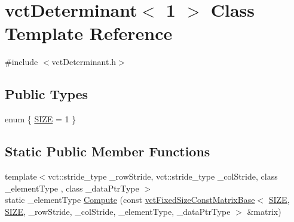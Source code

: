 \hypertarget{classvct_determinant_3_011_01_4}{\section{vct\-Determinant$<$ 1 $>$ Class Template Reference}
\label{classvct_determinant_3_011_01_4}
}


{\ttfamily \#include $<$vct\-Determinant.\-h$>$}

\subsection*{Public Types}
\begin{DoxyCompactItemize}
\item 
enum \{ \hyperlink{classvct_determinant_3_011_01_4_ae73865b91d79204caa787acd03c99885a105e61510b1504060ff5d4bf5e35f8f9}{S\-I\-Z\-E} = 1
 \}
\end{DoxyCompactItemize}
\subsection*{Static Public Member Functions}
\begin{DoxyCompactItemize}
\item 
{\footnotesize template$<$vct\-::stride\-\_\-type \-\_\-row\-Stride, vct\-::stride\-\_\-type \-\_\-col\-Stride, class \-\_\-element\-Type , class \-\_\-data\-Ptr\-Type $>$ }\\static \-\_\-element\-Type \hyperlink{classvct_determinant_3_011_01_4_a6406b6e1406b14ea280cc5dec6d2ad99}{Compute} (const \hyperlink{classvct_fixed_size_const_matrix_base}{vct\-Fixed\-Size\-Const\-Matrix\-Base}$<$ \hyperlink{classvct_determinant_3_011_01_4_ae73865b91d79204caa787acd03c99885a105e61510b1504060ff5d4bf5e35f8f9}{S\-I\-Z\-E}, \hyperlink{classvct_determinant_3_011_01_4_ae73865b91d79204caa787acd03c99885a105e61510b1504060ff5d4bf5e35f8f9}{S\-I\-Z\-E}, \-\_\-row\-Stride, \-\_\-col\-Stride, \-\_\-element\-Type, \-\_\-data\-Ptr\-Type $>$ \&matrix)
\end{DoxyCompactItemize}


